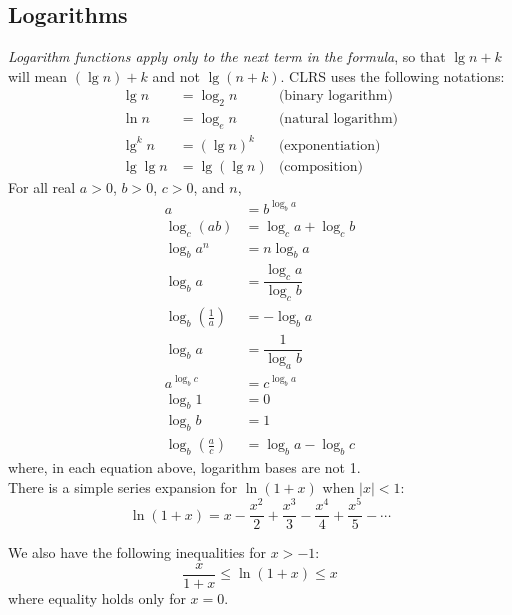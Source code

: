 \subsection{Logarithms}
\emph{Logarithm functions apply only to the next term in the formula}, so that $ \lg n + k $ will mean $ \left( \lg n\right) +k $ and not $ \lg(n+k) $.
CLRS uses the following notations:
\begin{align*}
\lg n &= \log_2 n &\text{(binary logarithm)}\\
\ln n &= \log_e n &\text{(natural logarithm)}\\
\lg^kn &= (\lg n)^k &\text{(exponentiation)}\\
\lg\lg n &= \lg (\lg n) &\text{(composition)}
\end{align*}
For all real $ a > 0 $, $ b > 0 $, $ c > 0 $, and $ n $,
\begin{align*}
a &= b^{\log_ba}\\
\log_c(ab) &= \log_ca+\log_cb\\
\log_ba^n &= n\log_ba\\
\log_ba &= \dfrac{\log_ca}{\log_cb}\\
\log_b\left( \frac{1}{a}\right) &= -\log_ba\\
\log_ba &= \dfrac{1}{\log_ab}\\
a^{\log_bc}&=c^{\log_ba}\\
\log_b 1 &= 0\\
\log_bb &= 1\\
\log_b\left( \frac{a}{c}\right) &= \log_b a - \log_b c
\end{align*}
where, in each equation above, logarithm bases are not 1.\\

There is a simple series expansion for $ \ln (1+x) $ when $ |x| < 1 $:
$$ \ln(1+x) = x - \dfrac{x^2}{2} + \dfrac{x^3}{3} - \dfrac{x^4}{4} + \dfrac{x^5}{5} - \cdots $$

We also have the following inequalities for $ x > -1 $:
$$ \dfrac{x}{1+x} \leq \ln(1+x) \leq x $$
where equality holds only for $ x = 0 $.